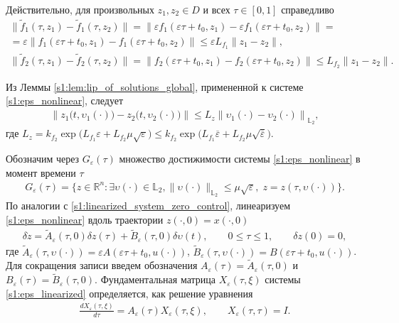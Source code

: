 \documentclass[../main.tex]{subfiles}
\begin{document}
Действительно, для произвольных $z_1, z_2 \in D$ и всех $\tau \in [0, 1]$ справедливо
\begin{gather*}
	\| \widetilde{f}_1(\tau, z_1) - \widetilde{f}_1(\tau, z_2) \| = \| \varepsilon f_1(\varepsilon \tau + t_0, z_1) - \varepsilon f_1(\varepsilon \tau + t_0, z_2) \| = \\ =
	\varepsilon \| f_1(\varepsilon \tau + t_0, z_1) - f_1(\varepsilon \tau + t_0, z_2) \| \leqslant \varepsilon L_{f_1} \|z_1 - z_2 \|, \\
	\| \widetilde{f}_2 (\tau,z_1) - \widetilde{f}_2 (\tau,z_2) \| = \| f_2(\varepsilon \tau + t_0,z_1) - f_2(\varepsilon \tau + t_0,z_2) \| \leqslant L_{f_2} \|z_1 - z_2 \|.
\end{gather*}
 
Из Леммы \ref{s1:lem:lip_of_solutions_global}, примененной к системе \eqref{s1:eps_nonlinear}, следует
\begin{gather*}
 \left\| z_1\big(t, \upsilon_1(\cdot) \big) - z_2\big(t, \upsilon_2(\cdot)\big) \right\| \leqslant L_z \left\|\upsilon_1(\cdot) - \upsilon_2(\cdot) \right\|_{\mathbb{L}_2},
\end{gather*}
где $ L_z = k_{f_2} \exp\Big( L_{f_1} \varepsilon + L_{f_2} \mu \sqrt{\varepsilon} \Big) \leqslant k_{f_2} \exp\Big( L_{f_1} \overline{\varepsilon} + L_{f_2} \mu \sqrt{\overline{\varepsilon}} \Big)$.
 
Обозначим через $G_{\varepsilon}(\tau)$ множество достижимости системы \eqref{s1:eps_nonlinear} в момент времени $\tau$
\begin{gather*}
 G_{\varepsilon}(\tau) = \{z\in \mathbb{R}^n:\exists \upsilon(\cdot)\in \mathbb{L}_2, \lVert \upsilon(\cdot)\rVert_{\mathbb{L}_2}
 \leqslant \mu \sqrt{\varepsilon}, \; z=z(\tau, \upsilon(\cdot))\}.
\end{gather*}
По аналогии с \eqref{s1:linearized_system_zero_control}, линеаризуем \eqref{s1:eps_nonlinear} вдоль траектории $ z(\cdot,0) = x(\cdot, 0) $
\begin{gather}\label{s1:eps_linearized}
 \delta\dot{z} = \widetilde{A}_{\varepsilon}(\tau, 0) \delta z(\tau) +\widetilde{B}_{\varepsilon}(\tau, 0) \delta \upsilon(t),\qquad 0 \leqslant \tau \leqslant 1, \qquad \delta z(0) = 0,
\end{gather}
где $ \widetilde{A}_{\varepsilon}(\tau, \upsilon(\cdot)) = \varepsilon A(\varepsilon \tau + t_0, u(\cdot)) $, $\widetilde{B}_{\varepsilon}(\tau, \upsilon(\cdot)) = B(\varepsilon \tau + t_0, u(\cdot)) $. 
Для сокращения записи введем обозначения $A_{\varepsilon}(\tau) = \widetilde{A}_{\varepsilon}(\tau, 0)$ и $B_{\varepsilon}(\tau) = \widetilde{B}_{\varepsilon}(\tau, 0)$.
Фундаментальная матрица $ X_{\varepsilon}(\tau,\xi) $ системы \eqref{s1:eps_linearized} определяется, как решение уравнения
\begin{gather*}
 \frac{dX_{\varepsilon}(\tau,\xi)}{d\tau} = A_{\varepsilon}(\tau) X_{\varepsilon}(\tau,\xi), \qquad X_{\varepsilon}(\tau,\tau) = I. 
\end{gather*}
\end{document}
